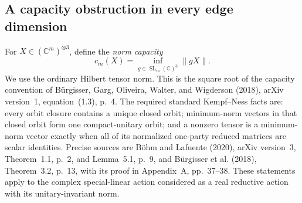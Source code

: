 \subsection{A capacity obstruction in every edge dimension}

For $X\in(\mathbb C^m)^{\otimes3}$, define the \emph{norm capacity}
\[
 c_m(X)=\inf_{g\in\operatorname{SL}_m(\mathbb C)^3}\|gX\|.
\]
We use the ordinary Hilbert tensor norm. This is the square root of
the capacity convention of B\"urgisser, Garg, Oliveira, Walter, and
Wigderson (2018), arXiv version~1, equation~(1.3), p.~4.
The required standard Kempf--Ness facts are: every orbit closure
contains a unique closed orbit; minimum-norm vectors in that closed
orbit form one compact-unitary orbit; and a nonzero tensor is a
minimum-norm vector exactly when all of its normalized one-party
reduced matrices are scalar identities. Precise sources are B\"ohm
and Lafuente (2020), arXiv version~3, Theorem~1.1, p.~2, and
Lemma~5.1, p.~9, and B\"urgisser et al. (2018), Theorem~3.2, p.~13,
with its proof in Appendix~A, pp.~37--38. These statements apply to
the complex special-linear action considered as a real reductive
action with its unitary-invariant norm.

